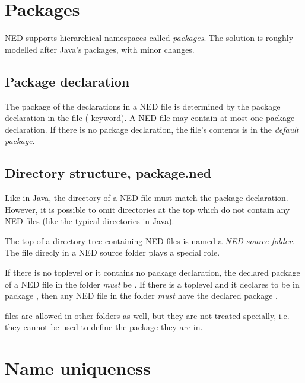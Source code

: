 \section{Packages}

NED supports hierarchical namespaces called \textit{packages}. The solution
is roughly modelled after Java's packages, with minor changes.
\subsection{Package declaration}

The package of the declarations in a NED file is determined by the package
declaration in the file ( keyword). A NED file may contain at
most one package declaration. If there is no package declaration, the file's
contents is in the \textit{default package}.

\subsection{Directory structure, package.ned}

Like in Java, the directory of a NED file must match the package
declaration. However, it is possible to omit directories at the top which do
not contain any NED files (like the typical 
directories in Java).

The top of a directory tree containing NED files is named a \textit{NED source
folder}. The  file direcly in a NED source folder plays a
special role.

If there is no toplevel  or it contains no package declaration,
the declared package of a NED file in the folder 
\textit{must} be .
If there is a toplevel  and it declares to be in package
, then any NED file in the folder 
\textit{must} have the declared package .

\begin{note}
     files are allowed in other folders as well, but they
    are not treated specially, i.e. they cannot be used to define the package
    they are in.
\end{note}

\section{Name uniqueness}

